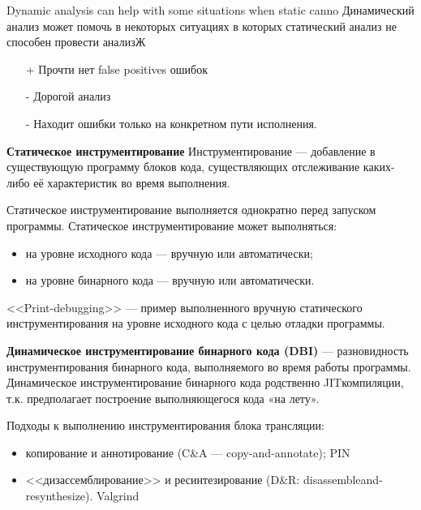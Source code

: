 
Dynamic analysis can help with some situations when static canno
Динамический анализ может помочь в некоторых ситуациях в которых статический анализ не способен провести анализЖ
\begin{itemize}
    \item[+] Прочти нет false positives ошибок
    \item[-] Дорогой анализ
    \item[-] Находит ошибки только на конкретном пути исполнения.
\end{itemize}

\textbf{Статическое инструментирование}
Инструментирование — добавление в существующую программу блоков кода, существляющих отслеживание каких-либо её характеристик во время выполнения.

Статическое инструментирование выполняется однократно перед запуском программы.
Статическое инструментирование может выполняться:
\begin{itemize}
    \item на уровне исходного кода — вручную или автоматически;
    \item на уровне бинарного кода — вручную или автоматически.
\end{itemize}

<<Print-debugging>> — пример выполненного вручную статического инструментирования на уровне исходного кода с целью отладки программы.

\textbf{Динамическое инструментирование бинарного кода (DBI)} — разновидность инструментирования бинарного кода, выполняемого во время работы программы. Динамическое инструментирование бинарного кода родственно JITкомпиляции, т.к. предполагает построение выполняющегося кода «на лету».

Подходы к выполнению инструментирования блока трансляции:
\begin{itemize}
    \item копирование и аннотирование (C\&A — copy-and-annotate); PIN
    \item <<дизассемблирование>> и ресинтезирование (D\&R: disassembleand-resynthesize). Valgrind
\end{itemize}